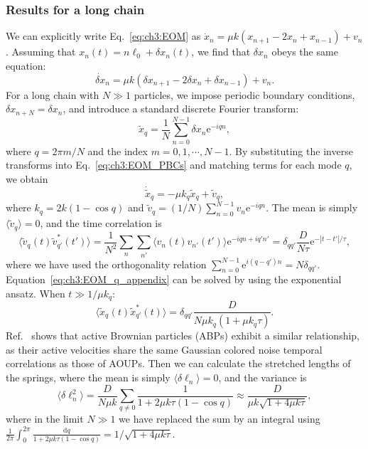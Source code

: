 \subsubsection{Results for a long chain}
\label{sec:ch3:chain}

We can explicitly write Eq.~\eqref{eq:ch3:EOM} as $\dot{x}_n = \mu k (x_{n+1}-2x_n+x_{n-1}) +v_n$. Assuming that $x_n(t)=n\ell_0+\delta x_n(t)$, we find that $\delta x_n$ obeys the same equation:
\begin{equation}\label{eq:ch3:EOM_PBCs}
    \dot{\delta x}_n = \mu k (\delta x_{n+1}-2\delta x_n+\delta x_{n-1}) +v_n.
\end{equation}
For a long chain with $N\gg 1$ particles, we impose periodic boundary conditions, $\delta x_{n+N} = \delta x_{n}$, and introduce a standard discrete Fourier transform:
\begin{equation}
    \tilde{x}_q=\frac{1}{N}\sum_{n=0}^{N-1}\delta x_n\mathrm{e}^{-iqn},
\end{equation}
where $q=2\pi m/N$ and the index $m=0,1,\cdots,N-1$. By substituting the inverse transforms into Eq.~\eqref{eq:ch3:EOM_PBCs} and matching terms for each mode $q$, we obtain
\begin{equation}\label{eq:ch3:EOM_q_appendix}
    \dot{\tilde{x}}_q = -\mu k_q\tilde{x}_q+ \tilde{v}_q,
\end{equation}
where $k_q=2k(1-\cos q)$ and $\tilde{v}_q=(1/N)\sum_{n=0}^{N-1}v_n\mathrm{e}^{-iqn}$. The mean is simply $\langle \tilde{v}_q\rangle = 0$, and the time correlation is
\begin{equation}
    \langle \tilde{v}^{\phantom{\ast}}_q(t)\tilde{v}^\ast_{q'}(t')\rangle = \frac{1}{N^2}\sum_{n}\sum_{n'}\langle v_n(t) v_{n'}(t')\rangle\mathrm{e}^{-iqn+iq'n'} = \delta_{qq'}\frac{D}{N\tau}\mathrm{e}^{-|t-t'|/\tau},
\end{equation}
where we have used the orthogonality relation $\sum_{n=0}^{N-1}\mathrm{e}^{i(q-q')n}=N\delta_{qq'}$. Equation~\eqref{eq:ch3:EOM_q_appendix} can be solved by using the exponential ansatz. When $t\gg 1/\mu k_q$:
\begin{equation}
    \langle \tilde{x}^{\phantom{\ast}}_q(t)\tilde{x}^\ast_{q'}(t)\rangle =\delta_{qq'}\frac{D}{N\mu k_q(1+\mu k_q\tau)}.
\end{equation}
Ref.~\cite{henkes2020dense} shows that active Brownian particles (ABPs) exhibit a similar relationship, as their active velocities share the same Gaussian colored noise temporal correlations as those of AOUPs. Then we can calculate the stretched lengths of the springs, where the mean is simply $\langle\delta\ell_n\rangle = 0$, and the variance is
\begin{equation}
    \langle \delta\ell_n^2\rangle
    =\frac{D}{N\mu k}\sum_{q\neq 0}\frac{1}{1+2\mu k\tau (1-\cos q)}
    \approx\frac{D}{\mu k\sqrt{1+4\mu k\tau}},
\end{equation}
where in the limit $N\gg 1$ we have replaced the sum by an integral using $\displaystyle\frac{1}{2\pi}\int_0^{2\pi}\frac{\mathrm{d} q}{1+2\mu k\tau (1-\cos q)}=1/\sqrt{1+4\mu k\tau}$.

